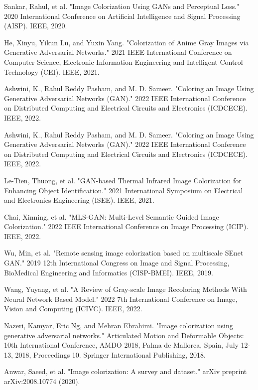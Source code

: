 \documentclass[conference]{IEEEtran}
\begin{document}
\begin{thebibliography}{00}

 Sankar, Rahul, et al. "Image Colorization Using GANs and Perceptual Loss." 2020 International Conference on Artificial Intelligence and Signal Processing (AISP). IEEE, 2020.

 He, Xinyu, Yikun Lu, and Yuxin Yang. "Colorization of Anime Gray Images via Generative Adversarial Networks." 2021 IEEE International Conference on Computer Science, Electronic Information Engineering and Intelligent Control Technology (CEI). IEEE, 2021.

 Ashwini, K., Rahul Reddy Pasham, and M. D. Sameer. "Coloring an Image Using Generative Adversarial Networks (GAN)." 2022 IEEE International Conference on Distributed Computing and Electrical Circuits and Electronics (ICDCECE). IEEE, 2022.

 Ashwini, K., Rahul Reddy Pasham, and M. D. Sameer. "Coloring an Image Using Generative Adversarial Networks (GAN)." 2022 IEEE International Conference on Distributed Computing and Electrical Circuits and Electronics (ICDCECE). IEEE, 2022.

 Le-Tien, Thuong, et al. "GAN-based Thermal Infrared Image Colorization for Enhancing Object Identification." 2021 International Symposium on Electrical and Electronics Engineering (ISEE). IEEE, 2021.

 Chai, Xinning, et al. "MLS-GAN: Multi-Level Semantic Guided Image Colorization." 2022 IEEE International Conference on Image Processing (ICIP). IEEE, 2022.

 Wu, Min, et al. "Remote sensing image colorization based on multiscale SEnet GAN." 2019 12th International Congress on Image and Signal Processing, BioMedical Engineering and Informatics (CISP-BMEI). IEEE, 2019.

 Wang, Yuyang, et al. "A Review of Gray-scale Image Recoloring Methods With Neural Network Based Model." 2022 7th International Conference on Image, Vision and Computing (ICIVC). IEEE, 2022.

 Nazeri, Kamyar, Eric Ng, and Mehran Ebrahimi. "Image colorization using generative adversarial networks." Articulated Motion and Deformable Objects: 10th International Conference, AMDO 2018, Palma de Mallorca, Spain, July 12-13, 2018, Proceedings 10. Springer International Publishing, 2018.

 Anwar, Saeed, et al. "Image colorization: A survey and dataset." arXiv preprint arXiv:2008.10774 (2020).


\end{thebibliography}
\end{document}
